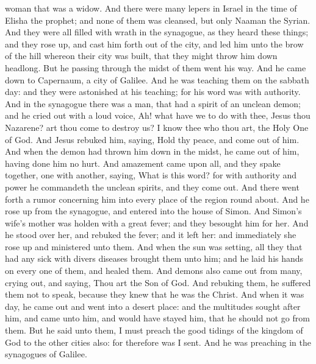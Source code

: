 woman that was a widow. And there were many lepers in Israel in the time of Elisha the prophet; and none of them was cleansed, but only Naaman the Syrian. And they were all filled with wrath in the synagogue, as they heard these things; and they rose up, and cast him forth out of the city, and led him unto the brow of the hill whereon their city was built, that they might throw him down headlong. But he passing through the midst of them went his way.  And he came down to Capernaum, a city of Galilee. And he was teaching them on the sabbath day: and they were astonished at his teaching; for his word was with authority. And in the synagogue there was a man, that had a spirit of an unclean demon; and he cried out with a loud voice, Ah! what have we to do with thee, Jesus thou Nazarene? art thou come to destroy us? I know thee who thou art, the Holy One of God. And Jesus rebuked him, saying, Hold thy peace, and come out of him. And when the demon had thrown him down in the midst, he came out of him, having done him no hurt. And amazement came upon all, and they spake together, one with another, saying, What is this word? for with authority and power he commandeth the unclean spirits, and they come out. And there went forth a rumor concerning him into every place of the region round about.  And he rose up from the synagogue, and entered into the house of Simon. And Simon’s wife’s mother was holden with a great fever; and they besought him for her. And he stood over her, and rebuked the fever; and it left her: and immediately she rose up and ministered unto them.  And when the sun was setting, all they that had any sick with divers diseases brought them unto him; and he laid his hands on every one of them, and healed them. And demons also came out from many, crying out, and saying, Thou art the Son of God. And rebuking them, he suffered them not to speak, because they knew that he was the Christ.  And when it was day, he came out and went into a desert place: and the multitudes sought after him, and came unto him, and would have stayed him, that he should not go from them. But he said unto them, I must preach the good tidings of the kingdom of God to the other cities also: for therefore was I sent.  And he was preaching in the synagogues of Galilee. 

